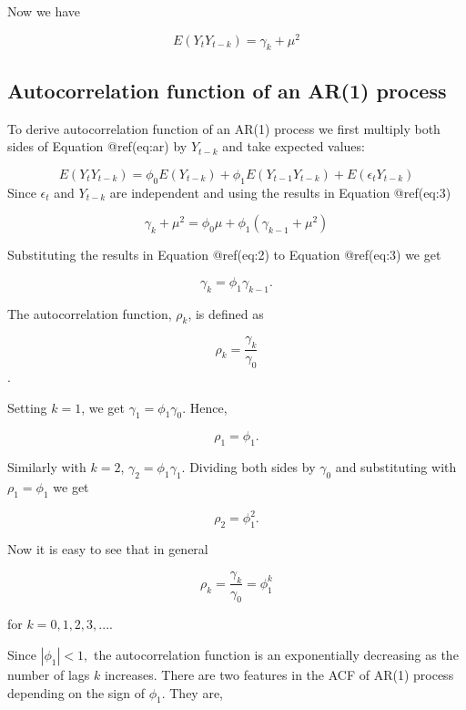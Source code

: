 \documentclass[
  11pt,
  a4paper,
]{report}
\begin{document}
Now we have

\begin{equation}
  \label{eq:3}
  E(Y_t Y_{t-k}) = \gamma_k + \mu^2
\end{equation}

\subsection{Autocorrelation function of an AR(1)
process}\label{autocorrelation-function-of-an-ar1-process}

To derive autocorrelation function of an AR(1) process we first multiply
both sides of Equation @ref(eq:ar) by \(Y_{t-k}\) and take expected
values:

\[E(Y_tY_{t-k})=\phi_0E(Y_{t-k})+\phi_1 E(Y_{t-1}Y_{t-k})+E(\epsilon_tY_{t-k})\]
Since \(\epsilon_t\) and \(Y_{t-k}\) are independent and using the
results in Equation @ref(eq:3)

\[\gamma_k + \mu^2 = \phi_0 \mu+\phi_1(\gamma_{k-1}+\mu^2)\]

Substituting the results in Equation @ref(eq:2) to Equation @ref(eq:3)
we get

\begin{equation}
\label{eq:5}
\gamma_k = \phi_1 \gamma_{k-1}.
\end{equation}

The autocorrelation function, \(\rho_k\), is defined as

\[\rho_k = \frac{\gamma_k}{\gamma_0}\].

Setting \(k=1\), we get \(\gamma_1 = \phi_1\gamma_0.\) Hence,

\[\rho_1=\phi_1.\]

Similarly with \(k=2\), \(\gamma_2 = \phi_1 \gamma_1\). Dividing both
sides by \(\gamma_0\) and substituting with \(\rho_1=\phi_1\) we get

\[\rho_2=\phi_1^2.\]

Now it is easy to see that in general

\begin{equation}
\label{eq:acfar1}
\rho_k = \frac{\gamma_k}{\gamma_0}=\phi_1^k 
\end{equation}

for \(k=0, 1, 2, 3, ...\).

Since \(|\phi_1| < 1,\) the autocorrelation function is an exponentially
decreasing as the number of lags \(k\) increases. There are two features
in the ACF of AR(1) process depending on the sign of \(\phi_1\). They
are,
\end{document}
